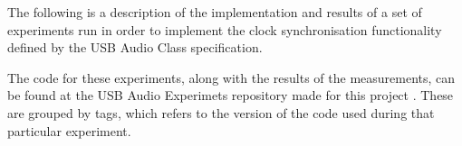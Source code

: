 
The following is a description of the implementation and results of a set of
experiments run in order to implement the clock synchronisation functionality
defined by the USB Audio Class specification.

The code for these experiments, along with the results of the measurements, can
be found at the USB Audio Experimets repository made for this project
\cite{github:usbAudioExperiments}. These are grouped by tags, which refers to
the version of the code used during that particular experiment.





